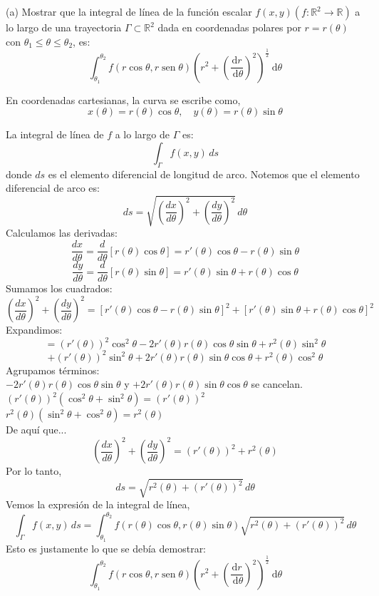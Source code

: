 \documentclass{article}
\theoremstyle{nonumberplain}
\begin{document}
(a) Mostrar que la integral de línea de la función escalar \( f(x, y)\left(f: \mathbb{R}^{2} \longrightarrow \mathbb{R}\right) \) a lo largo de una trayectoria \( \Gamma \subset \mathbb{R}^{2} \) dada en coordenadas polares por \( r=r(\theta) \) con \( \theta_{1} \leq \theta \leq \theta_{2} \), es:
\[
\int_{\theta_{1}}^{\theta_{2}} f(r \cos \theta, r \operatorname{sen} \theta)\left(r^{2}+\left(\frac{\mathrm{d} r}{\mathrm{~d} \theta}\right)^{2}\right)^{\frac{1}{2}} \mathrm{~d} \theta
\]

En coordenadas cartesianas, la curva se escribe como,
\[
  x(\theta) = r(\theta) \cos \theta, \quad y(\theta) = r(\theta) \sin \theta
  \]

La integral de línea de \( f \) a lo largo de \( \Gamma \) es:
\[
\int_\Gamma f(x, y) \, ds
\]
donde \( ds \) es el elemento diferencial de longitud de arco. Notemos que el elemento diferencial de arco es:
\[
ds = \sqrt{\left(\frac{dx}{d\theta}\right)^2 + \left(\frac{dy}{d\theta}\right)^2} \, d\theta
\]
Calculamos las derivadas:
\[
\frac{dx}{d\theta} = \frac{d}{d\theta} \left[ r(\theta) \cos \theta \right] = r'(\theta) \cos \theta - r(\theta) \sin \theta
\]
\[
\frac{dy}{d\theta} = \frac{d}{d\theta} \left[ r(\theta) \sin \theta \right] = r'(\theta) \sin \theta + r(\theta) \cos \theta
\]
Sumamos los cuadrados:
\[
\left(\frac{dx}{d\theta}\right)^2 + \left(\frac{dy}{d\theta}\right)^2 = \left[ r'(\theta) \cos \theta - r(\theta) \sin \theta \right]^2 + \left[ r'(\theta) \sin \theta + r(\theta) \cos \theta \right]^2
\]
Expandimos:
\[
= \left(r'(\theta)\right)^2 \cos^2 \theta - 2 r'(\theta) r(\theta) \cos \theta \sin \theta + r^2(\theta) \sin^2 \theta
\]
\[
+ \left(r'(\theta)\right)^2 \sin^2 \theta + 2 r'(\theta) r(\theta) \sin \theta \cos \theta + r^2(\theta) \cos^2 \theta
\]
Agrupamos términos:\\

\( -2 r'(\theta) r(\theta) \cos \theta \sin \theta \) y \( +2 r'(\theta) r(\theta) \sin \theta \cos \theta \) se cancelan.\\
\( (r'(\theta))^2 (\cos^2 \theta + \sin^2 \theta) = (r'(\theta))^2 \)\\
\( r^2(\theta) (\sin^2 \theta + \cos^2 \theta) = r^2(\theta) \)\\

De aquí que...
\[
\left(\frac{dx}{d\theta}\right)^2 + \left(\frac{dy}{d\theta}\right)^2 = (r'(\theta))^2 + r^2(\theta)
\]
Por lo tanto,
\[
ds = \sqrt{r^2(\theta) + \left(r'(\theta)\right)^2} \, d\theta
\]
Vemos la expresión de la integral de línea,
\[
\int_\Gamma f(x, y) \, ds = \int_{\theta_1}^{\theta_2} f(r(\theta) \cos \theta, r(\theta) \sin \theta) \sqrt{r^2(\theta) + (r'(\theta))^2} \, d\theta
\]
Esto es justamente lo que se debía demostrar:
\[
\int_{\theta_{1}}^{\theta_{2}} f(r \cos \theta, r \operatorname{sen} \theta)\left(r^{2}+\left(\frac{\mathrm{d} r}{\mathrm{~d} \theta}\right)^{2}\right)^{\frac{1}{2}} \mathrm{~d} \theta
\]
\end{document}
